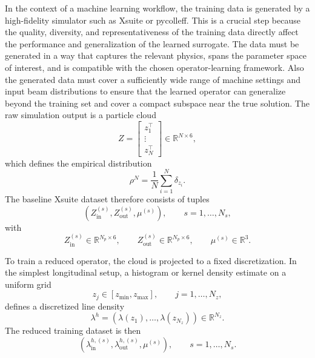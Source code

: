 \documentclass[11pt,a4paper]{article}
\begin{document}
\begin{sloppypar}
In the context of a machine learning workflow, the training data is generated by a high-fidelity simulator such as Xsuite or pycolleff. This is a crucial step because the quality, diversity, and representativeness of the training data directly affect the performance and generalization of the learned surrogate. The data must be generated in a way that captures the relevant physics, spans the parameter space of interest, and is compatible with the chosen operator-learning framework. Also the generated data must cover a sufficiently wide range of machine settings and input beam distributions to ensure that the learned operator can generalize beyond the training set and cover a compact subspace near the true solution. The raw simulation output is a particle cloud
\begin{equation}
 Z=
 \begin{bmatrix}
 z_1^\top\\
 \vdots\\
 z_N^\top
 \end{bmatrix}
 \in \mathbb{R}^{N\times 6},
 \label{eq:particle-cloud}
\end{equation}
which defines the empirical distribution
\begin{equation}
 \rho^N = \frac{1}{N} \sum_{i=1}^N \delta_{z_i}.
 \label{eq:empirical-measure}
\end{equation}
The baseline Xsuite dataset therefore consists of tuples
\begin{equation}
 (Z_{\mathrm{in}}^{(s)}, Z_{\mathrm{out}}^{(s)}, \mu^{(s)}),
 \qquad s=1,\dots,N_s,
 \label{eq:cloud-dataset}
\end{equation}
with
\begin{equation}
 Z_{\mathrm{in}}^{(s)} \in \mathbb{R}^{N_p\times 6},
 \qquad
 Z_{\mathrm{out}}^{(s)} \in \mathbb{R}^{N_p\times 6},
 \qquad
 \mu^{(s)} \in \mathbb{R}^3.
 \label{eq:dataset-shapes}
\end{equation}

To train a reduced operator, the cloud is projected to a fixed discretization. In the simplest longitudinal setup, a histogram or kernel density estimate on a uniform grid
\begin{equation}
 z_j \in [z_{\min}, z_{\max}],
 \qquad j=1,\dots,N_z,
 \label{eq:uniform-grid}
\end{equation}
defines a discretized line density
\begin{equation}
 \lambda^h = (\lambda(z_1),\dots,\lambda(z_{N_z})) \in \mathbb{R}^{N_z}.
 \label{eq:lambda-grid}
\end{equation}
The reduced training dataset is then
\begin{equation}
 (\lambda^{h,(s)}_{\mathrm{in}},\lambda^{h,(s)}_{\mathrm{out}},\mu^{(s)}),
 \qquad s=1,\dots,N_s.
 \label{eq:reduced-dataset}
\end{equation}


\end{sloppypar}
\end{document}
